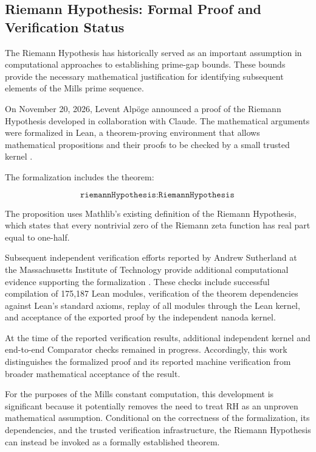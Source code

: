 \documentclass{article}
\begin{document}
\subsection{Riemann Hypothesis: Formal Proof and Verification Status}

The Riemann Hypothesis has historically served as an important assumption in computational approaches to establishing prime-gap bounds. These bounds provide the necessary mathematical justification for identifying subsequent elements of the Mills prime sequence.

On November 20, 2026, Levent Alpöge announced a proof of the Riemann Hypothesis developed in collaboration with Claude. The mathematical arguments were formalized in Lean, a theorem-proving environment that allows mathematical propositions and their proofs to be checked by a small trusted kernel \cite{alpoegeRH2026}.

The formalization includes the theorem:

\begin{equation}
    \texttt{riemannHypothesis} :
    \texttt{RiemannHypothesis}
\end{equation}

The proposition uses Mathlib's existing definition of the Riemann Hypothesis, which states that every nontrivial zero of the Riemann zeta function has real part equal to one-half.

Subsequent independent verification efforts reported by Andrew Sutherland at the Massachusetts Institute of Technology provide additional computational evidence supporting the formalization \cite{sutherlandRHVerification2026}. These checks include successful compilation of 175,187 Lean modules, verification of the theorem dependencies against Lean's standard axioms, replay of all modules through the Lean kernel, and acceptance of the exported proof by the independent nanoda kernel.

At the time of the reported verification results, additional independent kernel and end-to-end Comparator checks remained in progress. Accordingly, this work distinguishes the formalized proof and its reported machine verification from broader mathematical acceptance of the result.

For the purposes of the Mills constant computation, this development is significant because it potentially removes the need to treat RH as an unproven mathematical assumption. Conditional on the correctness of the formalization, its dependencies, and the trusted verification infrastructure, the Riemann Hypothesis can instead be invoked as a formally established theorem.
\end{document}
